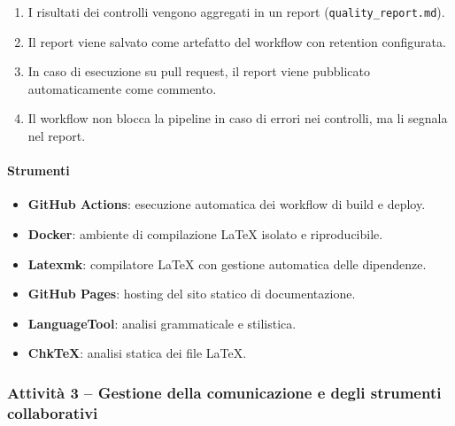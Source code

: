 \documentclass[a4paper, 11pt, oneside]{scrartcl}
\begin{document}
\begin{enumerate}
\begin{enumerate}[label=\alph*.]
                    \begin{itemize}
                        \item indice di leggibilità Gulpease;
                        \item analisi linguistica tramite LanguageTool;
                        \item analisi statica del codice \LaTeX{} tramite ChkTeX.
                    \end{itemize}
              \item I risultati dei controlli vengono aggregati in un report (\texttt{quality\_report.md}).
              \item Il report viene salvato come artefatto del workflow con retention configurata.
              \item In caso di esecuzione su pull request, il report viene pubblicato automaticamente come commento.
              \item Il workflow non blocca la pipeline in caso di errori nei controlli, ma li segnala nel report.
          \end{enumerate}
\end{enumerate}

\paragraph{Strumenti}
\begin{itemize}
    \item \textbf{GitHub Actions}: esecuzione automatica dei workflow di build e deploy.
    \item \textbf{Docker}: ambiente di compilazione \LaTeX{} isolato e riproducibile.
    \item \textbf{Latexmk}: compilatore \LaTeX{} con gestione automatica delle dipendenze.
    \item \textbf{GitHub Pages}: hosting del sito statico di documentazione.
    \item \textbf{LanguageTool}: analisi grammaticale e stilistica.
    \item \textbf{ChkTeX}: analisi statica dei file \LaTeX{}.
\end{itemize}

\subsubsection{Attività 3 – Gestione della comunicazione e degli strumenti collaborativi}
\end{document}
